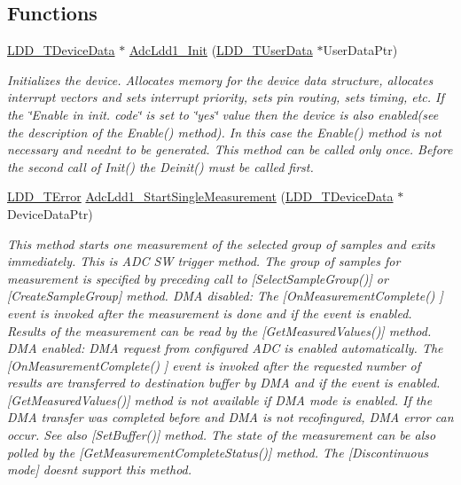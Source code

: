 \subsection*{Functions}
\begin{DoxyCompactItemize}
\item 
\hyperlink{group___p_e___types__module_gac5cf1362f1f0e3a2ce71b1bf2276d091}{L\+D\+D\+\_\+\+T\+Device\+Data} $\ast$ \hyperlink{group___adc_ldd1__module_gafdc37e93f468b5be237479085546273f}{Adc\+Ldd1\+\_\+\+Init} (\hyperlink{group___p_e___types__module_ga0b66a73f87238a782318aa0be7578e35}{L\+D\+D\+\_\+\+T\+User\+Data} $\ast$User\+Data\+Ptr)
\begin{DoxyCompactList}\small\item\em Initializes the device. Allocates memory for the device data structure, allocates interrupt vectors and sets interrupt priority, sets pin routing, sets timing, etc. If the \char`\"{}\+Enable in init. code\char`\"{} is set to \char`\"{}yes\char`\"{} value then the device is also enabled(see the description of the Enable() method). In this case the Enable() method is not necessary and needn\textquotesingle{}t to be generated. This method can be called only once. Before the second call of Init() the Deinit() must be called first. \end{DoxyCompactList}\item 
\hyperlink{group___p_e___types__module_ga24c2b045fd04e79e85f261ce4df35588}{L\+D\+D\+\_\+\+T\+Error} \hyperlink{group___adc_ldd1__module_ga00728ff1e652d8d8d778917ca27e37a1}{Adc\+Ldd1\+\_\+\+Start\+Single\+Measurement} (\hyperlink{group___p_e___types__module_gac5cf1362f1f0e3a2ce71b1bf2276d091}{L\+D\+D\+\_\+\+T\+Device\+Data} $\ast$Device\+Data\+Ptr)
\begin{DoxyCompactList}\small\item\em This method starts one measurement of the selected group of samples and exits immediately. This is A\+DC SW trigger method. The group of samples for measurement is specified by preceding call to \mbox{[}Select\+Sample\+Group()\mbox{]} or \mbox{[}Create\+Sample\+Group\mbox{]} method. D\+MA disabled\+: The \mbox{[}On\+Measurement\+Complete() \mbox{]} event is invoked after the measurement is done and if the event is enabled. Results of the measurement can be read by the \mbox{[}Get\+Measured\+Values()\mbox{]} method. D\+MA enabled\+: D\+MA request from configured A\+DC is enabled automatically. The \mbox{[}On\+Measurement\+Complete() \mbox{]} event is invoked after the requested number of results are transferred to destination buffer by D\+MA and if the event is enabled. \mbox{[}Get\+Measured\+Values()\mbox{]} method is not available if D\+MA mode is enabled. If the D\+MA transfer was completed before and D\+MA is not recofingured, D\+MA error can occur. See also \mbox{[}Set\+Buffer()\mbox{]} method. The state of the measurement can be also polled by the \mbox{[}Get\+Measurement\+Complete\+Status()\mbox{]} method. The \mbox{[}Discontinuous mode\mbox{]} doesn\textquotesingle{}t support this method. \end{DoxyCompactList}\item 

\end{DoxyCompactItemize}

